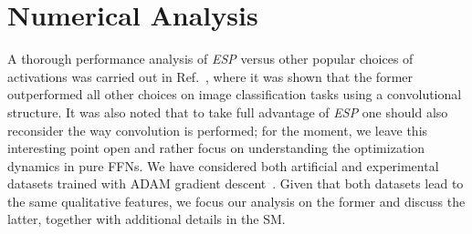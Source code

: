\documentclass[5p]{elsarticle}
\begin{document}
\section{Numerical Analysis}
%
A thorough performance analysis of {\it ESP} versus other popular choices of activations was carried out in Ref.~\cite{prajit}, where it was shown that the former outperformed all other choices on image classification tasks using a convolutional structure. It was also noted that to take full advantage of {\it ESP} one should also reconsider the way convolution is performed; for the moment, we leave this interesting point open and rather focus on understanding the optimization dynamics in pure FFNs.  We have considered both artificial and experimental datasets trained with ADAM gradient descent~\cite{adam}. Given that both datasets lead to the same qualitative features, we focus our analysis on the former and discuss the latter, together with additional details in the SM.
\end{document}
